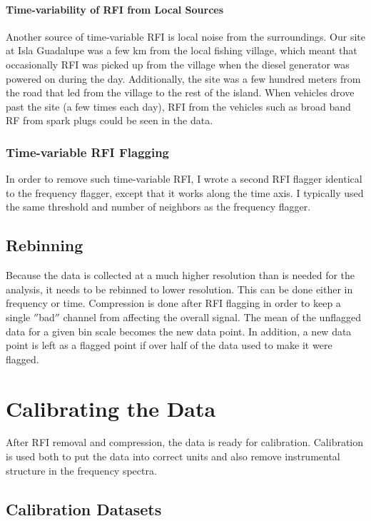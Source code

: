 \paragraph{Time-variability of RFI from Local Sources}

Another source of time-variable RFI is local noise from the surroundings. Our site at Isla Guadalupe was a few km from the local fishing village, which meant that occasionally RFI was picked up from the village when the diesel generator was powered on during the day. Additionally, the site was a few hundred meters from the road that led from the village to the rest of the island. When vehicles drove past the site (a few times each day), RFI from the vehicles such as broad band RF from spark plugs could be seen in the data. 

\subsubsection{Time-variable RFI Flagging}

In order to remove such time-variable RFI, I wrote a second RFI flagger identical to the frequency flagger, except that it works along the time axis. I typically used the same threshold and number of neighbors as the frequency flagger. 

\subsection{Rebinning}

Because the data is collected at a much higher resolution than is needed for the analysis, it needs to be rebinned to lower resolution. This can be done either in frequency or time. Compression is done after RFI flagging in order to keep a single $''$bad$''$ channel from affecting the overall signal. The mean of the unflagged data for a given bin scale becomes the new data point. In addition, a new data point is left as a flagged point if over half of the data used to make it were flagged. 

\section{Calibrating the Data}

After RFI removal and compression, the data is ready for calibration. Calibration is used both to put the data into correct units and also remove instrumental structure in the frequency spectra. 

\subsection{Calibration Datasets} \label{Sec:calsource}

